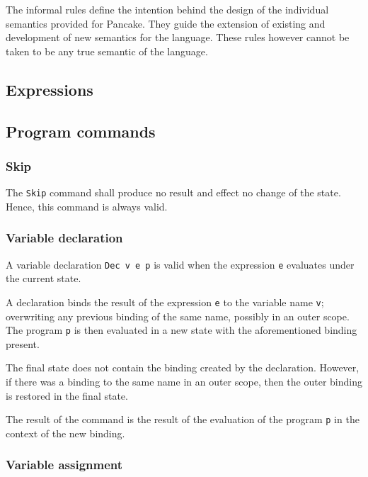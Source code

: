 \documentclass[graybox,envcountsect]{SVMonoEnhanced}
\begin{document}
The informal rules define the intention behind the design of the individual semantics provided for Pancake. They guide the extension of existing and development of new semantics for the language. These rules however cannot be taken to be any true semantic of the language.

\subsection{Expressions}
\label{sec:expressions}

\subsection{Program commands}
\label{sec:program-commands}

\lstset{language=pancakeAbs}

\subsubsection{Skip}
\label{sec:skip}

The \lstinline!Skip! command shall produce no result and effect no change of the state. Hence, this command is always valid.

\subsubsection{Variable declaration}
\label{sec:variable-declaration}

A variable declaration \lstinline!Dec v e p! is valid when the expression \lstinline!e! evaluates under the current state.

A declaration binds the result of the expression \lstinline!e! to the variable name \lstinline!v!; overwriting any previous binding of the same name, possibly in an outer scope. The program \lstinline!p! is then evaluated in a new state with the aforementioned binding present.

The final state does not contain the binding created by the declaration. However, if there was a binding to the same name in an outer scope, then the outer binding is restored in the final state.

The result of the command is the result of the evaluation of the program \lstinline!p! in the context of the new binding.

\subsubsection{Variable assignment}
\label{sec:variable-assign}
\end{document}
